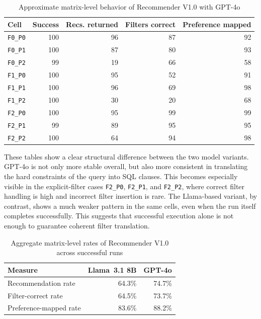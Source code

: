 \begin{table}[htbp]
\centering
\begin{tabular}{lrrrr}
\hline
Cell & Success & Recs. returned & Filters correct & Preference mapped \\
\hline
\texttt{F0\_P0} & 100 & 96 & 87 & 92 \\
\texttt{F0\_P1} & 100 & 87 & 80 & 93 \\
\texttt{F0\_P2} & 99 & 19 & 66 & 58 \\
\texttt{F1\_P0} & 100 & 95 & 52 & 91 \\
\texttt{F1\_P1} & 100 & 96 & 69 & 98 \\
\texttt{F1\_P2} & 100 & 30 & 20 & 68 \\
\texttt{F2\_P0} & 100 & 95 & 99 & 99 \\
\texttt{F2\_P1} & 99 & 89 & 95 & 95 \\
\texttt{F2\_P2} & 100 & 64 & 94 & 98 \\
\hline
\end{tabular}
\caption{Approximate matrix-level behavior of Recommender V1.0 with GPT-4o}
\label{table:recommendation-generation:v1-0-gpt-matrix-analysis}
\end{table}

These tables show a clear structural difference between the two model variants. GPT-4o is not only more stable overall, but also more consistent in translating the hard constraints of the query into SQL clauses. This becomes especially visible in the explicit-filter cases \texttt{F2\_P0}, \texttt{F2\_P1}, and \texttt{F2\_P2}, where correct filter handling is high and incorrect filter insertion is rare. The Llama-based variant, by contrast, shows a much weaker pattern in the same cells, even when the run itself completes successfully. This suggests that successful execution alone is not enough to guarantee coherent filter translation.

\begin{table}[htbp]
\centering
\begin{tabular}{lrr}
\hline
Measure & Llama~3.1 8B & GPT-4o \\
\hline
Recommendation rate & 64.3\% & 74.7\% \\
Filter-correct rate & 64.5\% & 73.7\% \\
Preference-mapped rate & 83.6\% & 88.2\% \\
\hline
\end{tabular}
\caption{Aggregate matrix-level rates of Recommender V1.0 across successful runs}
\label{table:recommendation-generation:v1-0-aggregate-matrix-rates}
\end{table}

